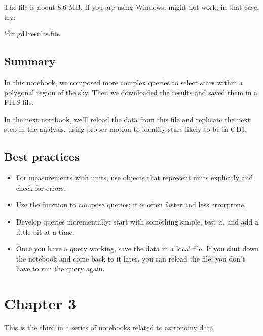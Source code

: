 \documentclass[letterpaper,10pt,english]{sphinxmanual}
\begin{document}
The file is about 8.6 MB.  If you are using Windows,  might not work; in that case, try:

\begin{sphinxVerbatim}[commandchars=\\\{\}]
!dir gd1\PYGZus{}results.fits
\end{sphinxVerbatim}


\section{Summary}
\label{\detokenize{02_coords:summary}}
In this notebook, we composed more complex queries to select stars within a polygonal region of the sky.  Then we downloaded the results and saved them in a FITS file.

In the next notebook, we’ll reload the data from this file and replicate the next step in the analysis, using proper motion to identify stars likely to be in GD\sphinxhyphen{}1.


\section{Best practices}
\label{\detokenize{02_coords:best-practices}}\begin{itemize}
\item {} 
For measurements with units, use  objects that represent units explicitly and check for errors.

\item {} 
Use the  function to compose queries; it is often faster and less error\sphinxhyphen{}prone.

\item {} 
Develop queries incrementally: start with something simple, test it, and add a little bit at a time.

\item {} 
Once you have a query working, save the data in a local file.  If you shut down the notebook and come back to it later, you can reload the file; you don’t have to run the query again.

\end{itemize}


\chapter{Chapter 3}
\label{\detokenize{03_motion:chapter-3}}\label{\detokenize{03_motion::doc}}
This is the third in a series of notebooks related to astronomy data.
\end{document}
